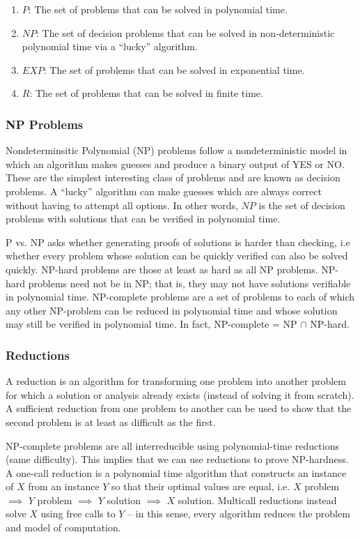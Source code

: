 \documentclass{article}
\begin{document}
    \begin{enumerate}
        \item $P$:  The set of problems that can be solved in polynomial time.
        \item $NP$:  The set of decision problems that can be solved in non-deterministic polynomial time via a ``lucky'' algorithm.
        \item $EXP$: The set of problems that can be solved in exponential time. 
        \item $R$: The set of problems that can be solved in finite time.
    \end{enumerate}
    
    \subsubsection{NP Problems}
    Nondeterminsitic Polynomial (NP) problems follow a nondeterministic model in which an algorithm makes guesses and produce a binary output of YES or NO. These are the simplest interesting class of problems and are known as decision problems. A ``lucky” algorithm can make guesses which are always correct without having to attempt all options. In other words, $NP$ is the set of decision problems with solutions that can be verified in polynomial time.
    
    P vs. NP asks whether generating proofs of solutions is harder than checking, i.e whether every problem whose solution can be quickly verified can also be solved quickly. NP-hard problems are those at least as hard as all NP problems. NP-hard problems need not be in NP; that is, they may not have solutions verifiable in polynomial time. NP-complete problems are a set of problems to each of which any other NP-problem can be reduced in polynomial time and whose solution may still be verified in polynomial time. In fact, NP-complete = NP $\cap$ NP-hard.
    
    \subsubsection{Reductions}
    A reduction is an algorithm for transforming one problem into another problem for which a solution or analysis already exists (instead of solving it from scratch). A sufficient reduction from one problem to another can be used to show that the second problem is at least as difficult as the first. 
    
    NP-complete problems are all interreducible using polynomial-time reductions (same difficulty). This implies that we can use reductions to prove NP-hardness. A one-call reduction is a polynomial time algorithm that constructs an instance of $X$ from an instance $Y$ so that their optimal values are equal, i.e. $X$ problem $\implies$ $Y$ problem $\implies$ $Y$ solution $\implies$ $X$ solution. Multicall reductions instead solve $X$ using free calls to $Y$ -- in this sense, every algorithm reduces the problem and model of computation.
    
\end{document}
